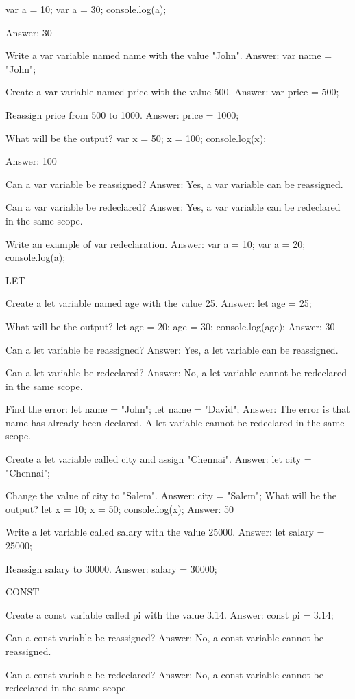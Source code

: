 var a = 10;
var a = 30;
console.log(a);

Answer: 30

Write a var variable named name with the value "John".
Answer: var name = "John";

Create a var variable named price with the value 500.
Answer: var price = 500;

Reassign price from 500 to 1000.
Answer: price = 1000;

What will be the output?
var x = 50;
x = 100;
console.log(x);

Answer: 100

Can a var variable be reassigned?
Answer: Yes, a var variable can be reassigned.

Can a var variable be redeclared?
Answer: Yes, a var variable can be redeclared in the same scope.

Write an example of var redeclaration.
Answer:
var a = 10;
var a = 20;
console.log(a);

LET

Create a let variable named age with the value 25.
Answer: let age = 25;

What will be the output?
let age = 20;
age = 30;
console.log(age);
Answer: 30

Can a let variable be reassigned?
Answer: Yes, a let variable can be reassigned.

Can a let variable be redeclared?
Answer: No, a let variable cannot be redeclared in the same scope.

Find the error:
let name = "John";
let name = "David";
Answer: The error is that name has already been declared. A let variable cannot be redeclared in the same scope.

Create a let variable called city and assign "Chennai".
Answer: let city = "Chennai";

Change the value of city to "Salem".
Answer: city = "Salem";
What will be the output?
let x = 10;
x = 50;
console.log(x);
Answer: 50

Write a let variable called salary with the value 25000.
Answer: let salary = 25000;

Reassign salary to 30000.
Answer: salary = 30000;

CONST

Create a const variable called pi with the value 3.14.
Answer: const pi = 3.14;

Can a const variable be reassigned?
Answer: No, a const variable cannot be reassigned.

Can a const variable be redeclared?
Answer: No, a const variable cannot be redeclared in the same scope.

